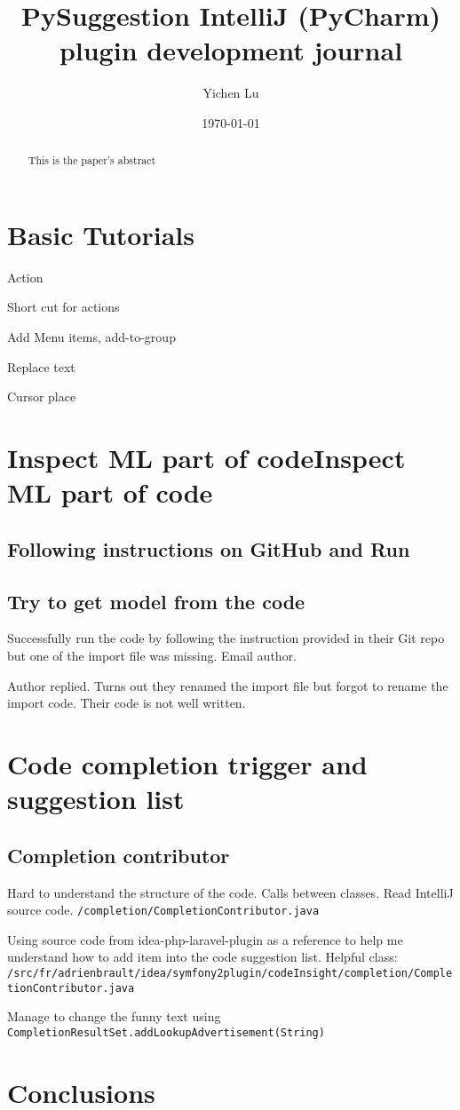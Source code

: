 \documentclass[11pt,a4paper]{article}
\title{PySuggestion IntelliJ (PyCharm) plugin development journal}
\author{Yichen Lu}
\date{\today}
\begin{document}
\maketitle

\begin{abstract}
This is the paper's abstract
\end{abstract}

\section{Basic Tutorials}
Action

Short cut for actions

Add Menu items, add-to-group

Replace text

Cursor place

\section{Inspect ML part of codeInspect ML part of code}

\subsection{Following instructions on GitHub and Run}

\subsection{Try to get model from the code}
Successfully run the code by following the instruction provided in their Git repo but one of the import file was missing. Email author.

Author replied. Turns out they renamed the import file but forgot to rename the import code. Their code is not well written.

\section{Code completion trigger and suggestion list}

\subsection{Completion contributor}

Hard to understand the structure of the code. Calls between classes.
Read IntelliJ source code. \texttt{/completion/CompletionContributor.java}

Using source code from idea-php-laravel-plugin as a reference to help me understand how to add item into the code suggestion list. Helpful class:
\texttt{/src/fr/adrienbrault/idea/symfony2plugin/codeInsight/completion/CompletionContributor.java}

Manage to change the funny text using \texttt{CompletionResultSet.addLookupAdvertisement(String)}


\section{Conclusions}
\end{document}
